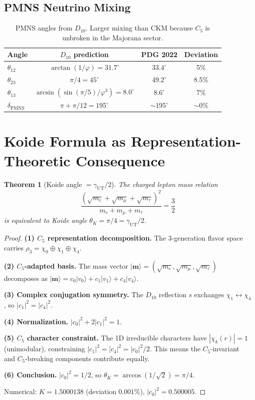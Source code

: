\documentclass[11pt,a4paper]{article}
\newtheorem{theorem}{Theorem}
\begin{document}
\subsection{PMNS Neutrino Mixing}

\begin{table}[h]
\centering
\begin{tabular}{lccc}
\toprule
Angle & $D_{10}$ prediction & PDG 2022 & Deviation \\
\midrule
$\theta_{12}$ & $\arctan(1/\varphi) = 31.7^\circ$ & $33.4^\circ$ & 5\% \\
$\theta_{23}$ & $\pi/4 = 45^\circ$ & $49.2^\circ$ & 8.5\% \\
$\theta_{13}$ & $\arcsin(\sin(\pi/5)/\varphi^3) = 8.0^\circ$ & $8.6^\circ$ & 7\% \\
$\delta_{\text{PMNS}}$ & $\pi + \pi/12 = 195^\circ$ & $\sim 195^\circ$ & $\sim 0\%$ \\
\bottomrule
\end{tabular}
\caption{PMNS angles from $D_{10}$. Larger mixing than CKM because $C_5$ is unbroken in the Majorana sector.}
\end{table}

\section{Koide Formula as Representation-Theoretic Consequence}
\label{sec:koide}

\begin{theorem}[Koide angle $= \gamma_{\text{UT}}/2$]
\label{thm:koide}
The charged lepton mass relation
\[
\frac{(\sqrt{m_e} + \sqrt{m_\mu} + \sqrt{m_\tau})^2}{m_e + m_\mu + m_\tau} = \frac{3}{2}
\]
is equivalent to Koide angle $\theta_K = \pi/4 = \gamma_{\text{UT}}/2$.
\end{theorem}

\begin{proof}
\textbf{(1) $C_5$ representation decomposition.} The 3-generation flavor space carries $\rho_3 = \chi_0 \oplus \chi_1 \oplus \chi_4$.

\textbf{(2) $C_5$-adapted basis.} The mass vector $|\mathbf{m}\rangle = (\sqrt{m_e}, \sqrt{m_\mu}, \sqrt{m_\tau})$ decomposes as $|\mathbf{m}\rangle = c_0|v_0\rangle + c_1|v_1\rangle + c_4|v_4\rangle$.

\textbf{(3) Complex conjugation symmetry.} The $D_{10}$ reflection $s$ exchanges $\chi_1 \leftrightarrow \chi_4$, so $|c_1|^2 = |c_4|^2$.

\textbf{(4) Normalization.} $|c_0|^2 + 2|c_1|^2 = 1$.

\textbf{(5) $C_5$ character constraint.} The 1D irreducible characters have $|\chi_k(r)| = 1$ (unimodular), constraining $|c_1|^2 = |c_4|^2 = |c_0|^2/2$. This means the $C_5$-invariant and $C_5$-breaking components contribute equally.

\textbf{(6) Conclusion.} $|c_0|^2 = 1/2$, so $\theta_K = \arccos(1/\sqrt{2}) = \pi/4$.

Numerical: $K = 1.5000138$ (deviation $0.001\%$), $|c_0|^2 = 0.500005$.
\end{proof}
\end{document}
